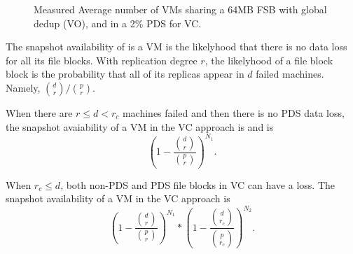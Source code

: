\begin{figure}[ht]
  \centering
  \caption{Measured Average number of VMs sharing a 64MB FSB with global dedup (VO), and in a 2\% PDS for VC.}
  \label{fig-fsb-links}
\end{figure}

The snapshot availability of is a VM is the likelyhood that
there is no  data loss for all its file blocks.
With replication degree $r$, the likelyhood of
a file block block is the probability that  
all of its replicas appear in $d$ failed machines. 
Namely, $\binom{d}{r}/ \binom{p}{r}$.


When there are $r \le d<r_c$ machines failed and then there is no PDS data loss,  
the snapshot avaiability of a VM in the VC approach is 
and is
\[
(1-\frac{\binom{d}{r}} { \binom{p}{r} })^{N_1}.
\]

When $r_c \leq d$, both non-PDS and PDS file blocks in VC can have a loss.
The snapshot availability of  a VM in the VC approach is
\[
(1-\frac{ \binom{d}{r}} { \binom{p}{r} })^{N_1} 
*
(1-\frac{ \binom{d}{r_c}} { \binom{p}{r_c} })^{N_2}.
\]

